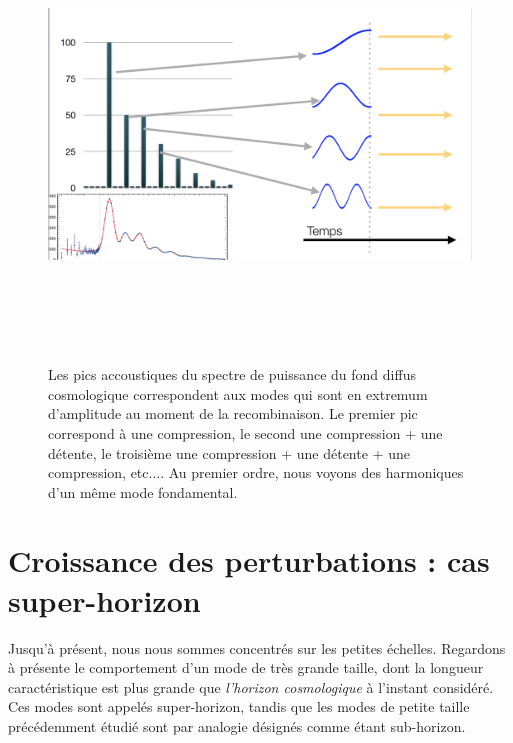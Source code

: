 \begin{figure}[htbp]
	\centering
		\includegraphics[height=12cm]{figs/bao2.png}
	\caption[Les pics accoustiques sont des extrema]{Les pics accoustiques du spectre de puissance du fond diffus cosmologique correspondent aux modes qui sont en extremum d'amplitude au moment de la recombinaison. Le premier pic correspond à une compression, le second une compression + une détente, le troisième une compression + une détente + une compression, etc.... Au premier ordre, nous voyons des harmoniques d'un même mode fondamental. }
	\label{f:bao2}
\end{figure}

\section{Croissance des perturbations : cas super-horizon}

Jusqu'à présent, nous nous sommes concentrés sur les petites échelles. Regardons à présente le comportement d'un mode de très grande taille, dont la longueur caractéristique est plus grande que \textit{l'horizon cosmologique} à l'instant considéré. Ces modes sont appelés super-horizon, tandis que les modes de petite taille précédemment étudié sont par analogie désignés comme étant sub-horizon.

